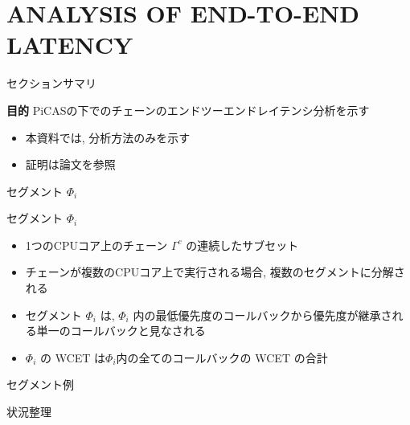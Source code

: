 
\section{ANALYSIS OF END-TO-END LATENCY}
\label{sec: analysis of end-to-end latency}

\begin{frame}{セクションサマリ}
    \begin{itembox}[l]{\textbf{目的}}
        PiCASの下でのチェーンのエンドツーエンドレイテンシ分析を示す
    \end{itembox}
\end{frame}

\begin{frame}{}
    \begin{itemize}
        \item 本資料では, 分析方法のみを示す
        \item 証明は論文を参照
    \end{itemize}
\end{frame}

\begin{frame}{セグメント $\Phi_i$}
    \begin{block}{セグメント $\Phi_i$}
        \begin{itemize}
            \item 1つのCPUコア上のチェーン $\Gamma^{c}$ の連続したサブセット
            \item チェーンが複数のCPUコア上で実行される場合, 複数のセグメントに分解される
            \item セグメント $\Phi_{i}$ は, $\Phi_{i}$ 内の最低優先度のコールバックから優先度が継承される単一のコールバックと見なされる
            \item $\Phi_{i}$ の WCET は$\Phi_{i}$内の全てのコールバックの WCET の合計
        \end{itemize}
    \end{block}
\end{frame}

\begin{frame}{セグメント例}
\end{frame}


\begin{frame}{状況整理}
\end{frame}


